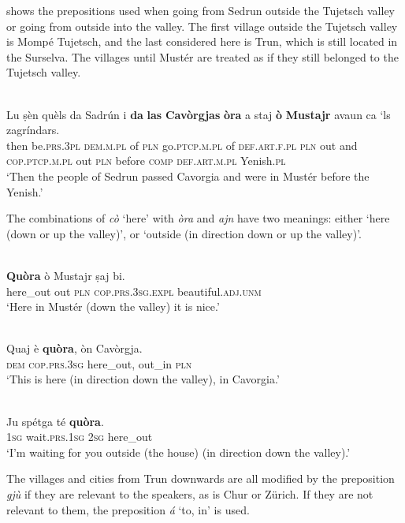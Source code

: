  shows the prepositions used when going from Sedrun outside the Tujetsch valley or going from outside into the valley. The first village outside the Tujetsch valley is Mompé Tujetsch, and the last considered here is Trun, which is still located in the Surselva. The villages until Mustér  are treated as if they still belonged to the Tujetsch valley.

\ea
\label{}
\\
\gll Lu ṣèn quèls da Sadrún i \textbf{da} \textbf{las} \textbf{Cavòrgjas} \textbf{òra} a staj \textbf{ò} \textbf{Mustajr} avaun ca `ls zagríndars.\\
then be.\textsc{prs.3pl} \textsc{dem.m.pl} of \textsc{pln} go.\textsc{ptcp.m.pl} of \textsc{def.art.f.pl} \textsc{pln} out and \textsc{cop.ptcp.m.pl} out \textsc{pln} before \textsc{comp} \textsc{def.art.m.pl} Yenish.\textsc{pl}\\
\glt `Then the people of Sedrun passed  Cavorgia and were in Mustér before the Yenish.'
\z

The combinations of \textit{cò} `here' with \textit{òra} and \textit{ajn} have two meanings: either `here (down or up the valley)', or `outside (in direction down or up the valley)'.

\ea
\label{ex:quòra1}
\\
\gll \textbf{Quòra} ò Mustajr ṣaj bi.\\
here\_out out \textsc{pln} \textsc{cop.prs.3sg.expl} beautiful.\textsc{adj.unm}\\
\glt `Here in Mustér (down the valley) it is nice.'
\z

\ea
\label{}
\\
\gll Quaj è \textbf{quòra}, òn Cavòrgja.\\
\textsc{dem} \textsc{cop.prs.3sg} here\_out, out\_in \textsc{pln}\\
\glt `This is here (in direction down the valley), in Cavorgia.'
\z

\ea
\label{}
\\
\gll Ju spétga té \textbf{quòra}.\\
\textsc{1sg} wait.\textsc{prs.1sg} \textsc{2sg} here\_out\\
\glt `I'm waiting for you outside (the house) (in direction down the valley).'
\z

The villages and cities from Trun downwards are all modified by the preposition \textit{gjù} if they are relevant to the speakers, as is Chur or Zürich. If they are not relevant to them, the preposition \textit{á} `to, in' is used.

